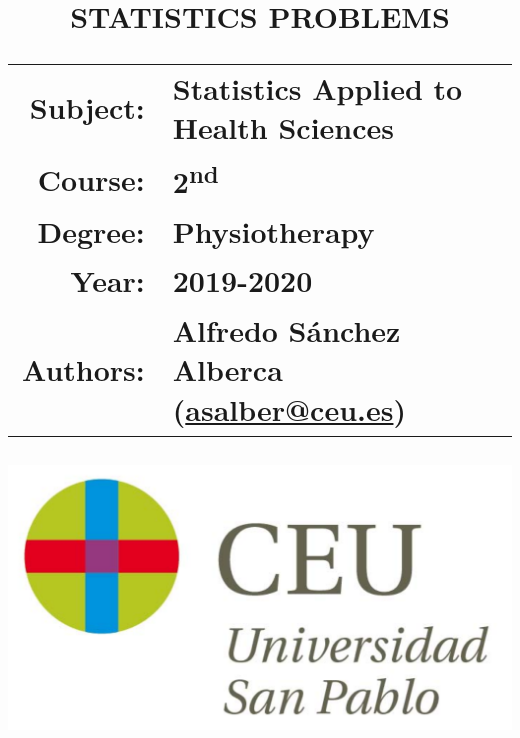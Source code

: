\documentclass[a4paper,titlepage]{article}
\begin{document}
\sloppy

\title{\vskip 2cm
\Huge \textbf{\textsf{\quad \textcolor{blueceu}{STATISTICS PROBLEMS}\quad}}\\
\vskip 1cm
\Large \sffamily
\begin{tabular}{rl}
\textcolor{blueceu}{Subject:} & Statistics Applied to Health Sciences            \\
\textcolor{blueceu}{Course:}  & 2\textsuperscript{nd}                            \\
\textcolor{blueceu}{Degree:}  & Physiotherapy                                    \\
\textcolor{blueceu}{Year:}    & 2019-2020                                        \\
\textcolor{blueceu}{Authors:}
                              & Alfredo S\'anchez Alberca (\url{asalber@ceu.es})
\end{tabular}
}

\author{}
\date{\includegraphics[scale=0.3]{img/logo_uspceu}}

\maketitle
\newpage
\tableofcontents
\newpage






% 
\end{document}
